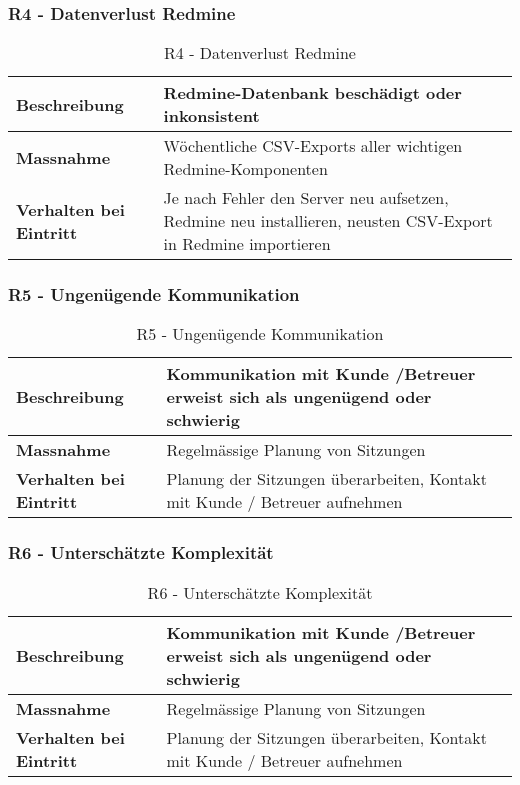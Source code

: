 \subsubsection{R4 - Datenverlust Redmine}
\begin{table}[H]
    \centering
    \def\arraystretch{2}
    \begin{tabular}{| p{4.5cm} | p{11.5cm} |} \hline
        \textbf{Beschreibung} & Redmine-Datenbank beschädigt oder inkonsistent\\ \hline
        \textbf{Massnahme} & Wöchentliche CSV-Exports aller wichtigen Redmine-Komponenten  \\ \hline
        \textbf{Verhalten bei Eintritt} & Je nach Fehler den Server neu aufsetzen, Redmine neu installieren, neusten CSV-Export in Redmine importieren \\ \hline 
    \end{tabular}
    \caption{R4 - Datenverlust Redmine}
\end{table}

\subsubsection{R5 - Ungenügende Kommunikation}
\begin{table}[H]
    \centering
    \def\arraystretch{2}
    \begin{tabular}{| p{4.5cm} | p{11.5cm} |} \hline
        \textbf{Beschreibung} & Kommunikation mit Kunde /Betreuer erweist sich als ungenügend oder schwierig \\ \hline
        \textbf{Massnahme} & Regelmässige Planung von Sitzungen\\ \hline
        \textbf{Verhalten bei Eintritt} & Planung der Sitzungen überarbeiten, Kontakt mit Kunde / Betreuer aufnehmen \\ \hline 
    \end{tabular}
    \caption{R5 - Ungenügende Kommunikation}
\end{table}

\subsubsection{R6 - Unterschätzte Komplexität}
\begin{table}[H]
    \centering
    \def\arraystretch{2}
    \begin{tabular}{| p{4.5cm} | p{11.5cm} |} \hline
        \textbf{Beschreibung} & Kommunikation mit Kunde /Betreuer erweist sich als ungenügend oder schwierig \\ \hline
        \textbf{Massnahme} & Regelmässige Planung von Sitzungen\\ \hline
        \textbf{Verhalten bei Eintritt} & Planung der Sitzungen überarbeiten, Kontakt mit Kunde / Betreuer aufnehmen \\ \hline 
    \end{tabular}
    \caption{R6 - Unterschätzte Komplexität}
\end{table}

